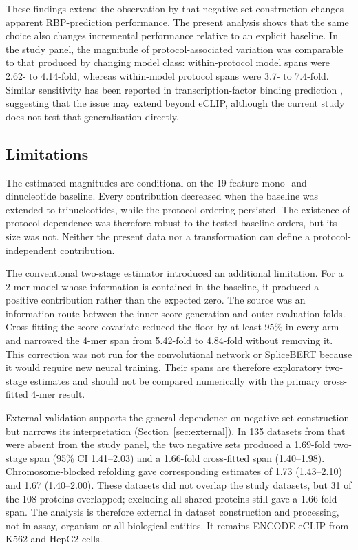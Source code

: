 These findings extend the observation by \citet{horlacher2023} that negative-set construction
changes apparent RBP-prediction performance. The present analysis shows that the same choice also
changes incremental performance relative to an explicit baseline. In the study panel, the magnitude
of protocol-associated variation was comparable to that produced by changing model class:
within-protocol model spans were 2.62- to 4.14-fold, whereas within-model protocol spans were
3.7- to 7.4-fold. Similar sensitivity has been reported in transcription-factor binding
prediction \citep{tourne2026}, suggesting that the issue may extend beyond eCLIP, although the
current study does not test that generalisation directly.

\subsection*{Limitations}

The estimated magnitudes are conditional on the 19-feature mono- and dinucleotide baseline.
Every contribution decreased when the baseline was extended to trinucleotides, while the
protocol ordering persisted. The existence of protocol dependence was therefore robust to the
tested baseline orders, but its size was not. Neither the present data nor a transformation can
define a protocol-independent contribution.

The conventional two-stage estimator introduced an additional limitation. For a 2-mer model
whose information is contained in the baseline, it produced a positive contribution rather than
the expected zero. The source was an information route between the inner score generation and
outer evaluation folds. Cross-fitting the score covariate reduced the floor by at least 95\%
in every arm and narrowed the 4-mer span from 5.42-fold to 4.84-fold without removing it. This
correction was not run for the convolutional network or SpliceBERT because it would require new
neural training. Their spans are therefore exploratory two-stage estimates and should not be
compared numerically with the primary cross-fitted 4-mer result.

External validation supports the general dependence on negative-set construction but narrows
its interpretation (Section~\ref{sec:external}). In 135 datasets from \citet{horlacher2023} that
were absent from the study panel,
the two negative sets produced a 1.69-fold two-stage span (95\% CI 1.41--2.03) and a 1.66-fold
cross-fitted span (1.40--1.98). Chromosome-blocked refolding gave corresponding estimates of
1.73 (1.43--2.10) and 1.67 (1.40--2.00). These datasets did not overlap the study datasets, but 31 of the
108 proteins overlapped;
excluding all shared proteins still gave a 1.66-fold span. The analysis is therefore external in
dataset construction and processing, not in assay, organism or all biological entities. It
remains ENCODE eCLIP from K562 and HepG2 cells.


